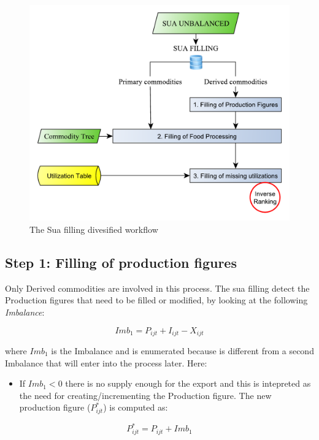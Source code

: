 \documentclass[]{article}
\providecommand{\tightlist}{%
  \setlength{\itemsep}{0pt}\setlength{\parskip}{0pt}}
\begin{document}
\begin{figure}

{\centering \includegraphics[width=0.65\linewidth]{images/04_SuaFilling2} 

}

\caption{\label{fig:f4}The Sua filling divesified workflow}\label{fig:f4}
\end{figure}

\subsection*{Step 1: Filling of production
figures}\label{step-1-filling-of-production-figures}

Only Derived commodities are involved in this process. The sua filling
detect the Production figures that need to be filled or modified, by
looking at the following \emph{Imbalance}:

\begin{equation}
\label{eq:imbalance1}
Imb_{1} = P_{ijt} + I_{ijt} - X_{ijt}
\end{equation}

where \(Imb_{1}\) is the Imbalance and is enumerated because is
different from a second Imbalance that will enter into the process
later. Here:

\begin{itemize}
\tightlist
\item
  If \(Imb_{1} < 0\) there is no supply enough for the export and this
  is intepreted as the need for creating/incrementing the Production
  figure. The new production figure (\(P^*_{ijt}\)) is computed as:
\end{itemize}

\begin{equation}
\label{eq:imbalance1}
 P^*_{ijt} = P_{ijt} + Imb_{1}
\end{equation}
\end{document}
